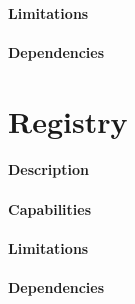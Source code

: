 \paragraph{Limitations}
\paragraph{Dependencies}

\section{Registry} %
\label{sec:registry}

\paragraph{Description}
\paragraph{Capabilities}
\paragraph{Limitations}
\paragraph{Dependencies}
